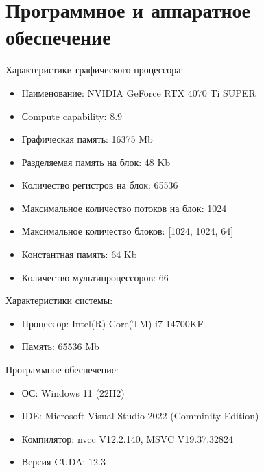 \section{Программное и аппаратное обеспечение}
Характеристики графического процессора:
\begin{itemize}[noitemsep, topsep=0pt]
	\item Наименование: NVIDIA GeForce RTX 4070 Ti SUPER
	\item Сompute capability: 8.9
	\item Графическая память: 16375 Mb
	\item Разделяемая память на блок: 48 Kb
	\item Количество регистров на блок: 65536
	\item Максимальное количество потоков на блок: 1024
	\item Максимальное количество блоков: [1024, 1024, 64]
	\item Константная память: 64 Kb
	\item Количество мультипроцессоров: 66
\end{itemize}

Характеристики системы:
\begin{itemize}[noitemsep, topsep=0pt]
	\item Процессор: Intel(R) Core(TM) i7-14700KF
	\item Память: 65536 Mb
\end{itemize}

Программное обеспечение:
\begin{itemize}[noitemsep, topsep=0pt]
	\item ОС: Windows 11 (22H2) 
	\item IDE: Microsoft Visual Studio 2022 (Comminity Edition)
	\item Компилятор: nvcc V12.2.140, MSVC V19.37.32824
	\item Версия CUDA: 12.3
\end{itemize}